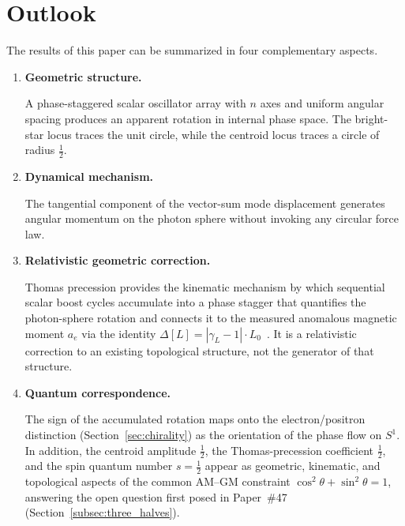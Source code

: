 \documentclass[%
 reprint, amsmath,amssymb, aps, prb, ]{revtex4-2}
\numberwithin{equation}{section}
\newcommand{\iphase}{\theta}
\begin{document}
\section{Outlook}
\label{sec:outlook}

The results of this paper can be summarized in four complementary aspects.

\begin{enumerate}

\item \textbf{Geometric structure.}

A phase-staggered scalar oscillator array with $n$ axes and uniform angular spacing produces an apparent rotation in internal phase space. The bright-star locus traces the unit circle, while the centroid locus traces a circle of radius $\tfrac{1}{2}$.

\item \textbf{Dynamical mechanism.}

The tangential component of the vector-sum mode displacement generates angular momentum on the photon sphere without invoking any circular force law.

\item \textbf{Relativistic geometric correction.}

Thomas precession provides the kinematic mechanism by which sequential scalar boost cycles accumulate into a phase stagger that quantifies the photon-sphere rotation and connects it to the measured anomalous magnetic moment $a_e$ via the identity $\Delta[L]=|\gamma_L-1|\cdot L_0$~\cite{hanamura47}. It is a relativistic correction to an existing topological structure, not the generator of that structure.

\item \textbf{Quantum correspondence.}

The sign of the accumulated rotation maps onto the electron/positron distinction (Section~\ref{sec:chirality}) as the orientation of the phase flow on $S^1$. In addition, the centroid amplitude $\tfrac{1}{2}$, the Thomas-precession coefficient $\tfrac{1}{2}$, and the spin quantum number $s=\tfrac{1}{2}$ appear as geometric, kinematic, and topological aspects of the common AM--GM constraint $\cos^2\iphase + \sin^2\iphase = 1$, answering the open question first posed in Paper~\#47~\cite{hanamura47} (Section~\ref{subsec:three_halves}).

\end{enumerate}
\end{document}

